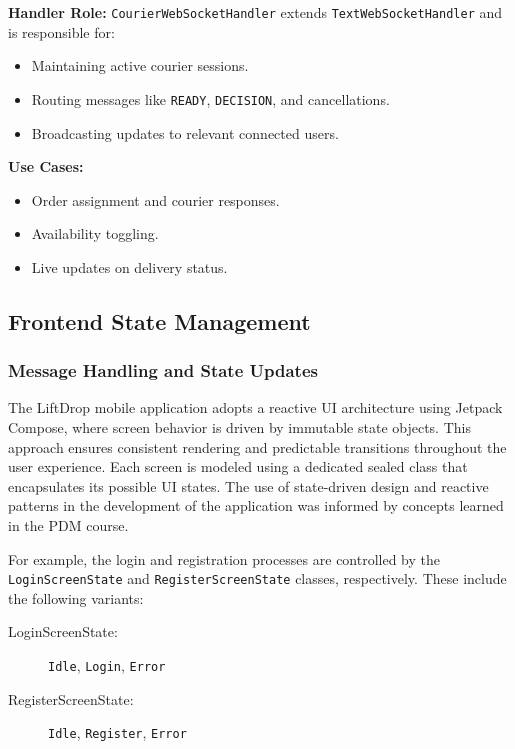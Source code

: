 \newpage

\textbf{Handler Role:}  
\texttt{CourierWebSocketHandler} extends \texttt{TextWebSocketHandler} and is responsible for:
\begin{itemize}
    \item Maintaining active courier sessions.
    \item Routing messages like \texttt{READY}, \texttt{DECISION}, and cancellations.
    \item Broadcasting updates to relevant connected users.
\end{itemize}

\textbf{Use Cases:}
\begin{itemize}
    \item Order assignment and courier responses.
    \item Availability toggling.
    \item Live updates on delivery status.
\end{itemize}



\newpage

\subsection{Frontend State Management}

\subsubsection{Message Handling and State Updates}

The LiftDrop mobile application adopts a reactive UI architecture using Jetpack Compose, where screen behavior is driven by immutable state objects. This approach ensures consistent rendering and predictable transitions throughout the user experience. Each screen is modeled using a dedicated sealed class that encapsulates its possible UI states. The use of state-driven design and reactive patterns in the development of the application was informed by concepts learned in the PDM course.

For example, the login and registration processes are controlled by the \texttt{LoginScreenState} and \texttt{RegisterScreenState} classes, respectively. These include the following variants:

\begin{description}
    \item[LoginScreenState:] \texttt{Idle}, \texttt{Login}, \texttt{Error}
    \item[RegisterScreenState:] \texttt{Idle}, \texttt{Register}, \texttt{Error}
\end{description}

